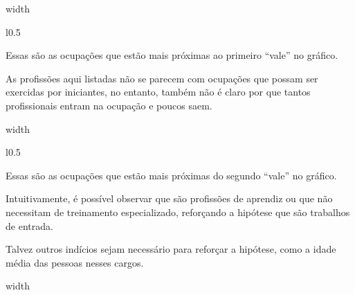 \documentclass[10pt,a4paper,final]{article}
\newcommand\disappearingrule{%
  \par %
  \vskip10pt %
  \leaders\vrule width \textwidth\vskip0.4pt %
  \nointerlineskip %
  \vskip10pt %
}
\begin{document}
\disappearingrule

\begin{minipage}[t][18\baselineskip]{\linewidth}
  \begin{wrapfigure}{l}{0.5\textwidth}
  \end{wrapfigure}
  
  Essas são as ocupações que estão mais próximas ao primeiro \enquote{vale} no gráfico.
  
  As profissões aqui listadas não se parecem com ocupações que possam ser exercidas por iniciantes, no entanto, também não é claro por que tantos profissionais entram na ocupação e poucos saem.
\end{minipage}

\disappearingrule

\begin{minipage}[t][18\baselineskip]{\linewidth}
  \begin{wrapfigure}{l}{0.5\textwidth}
  \end{wrapfigure}

  Essas são as ocupações que estão mais próximas do segundo  \enquote{vale} no gráfico.
  
  Intuitivamente, é possível observar que são profissões de aprendiz ou que não necessitam de treinamento especializado, reforçando a hipótese que são trabalhos de entrada.
  
  Talvez outros indícios sejam necessário para reforçar a hipótese, como a idade média das pessoas nesses cargos.
\end{minipage}

\disappearingrule
\end{document}
